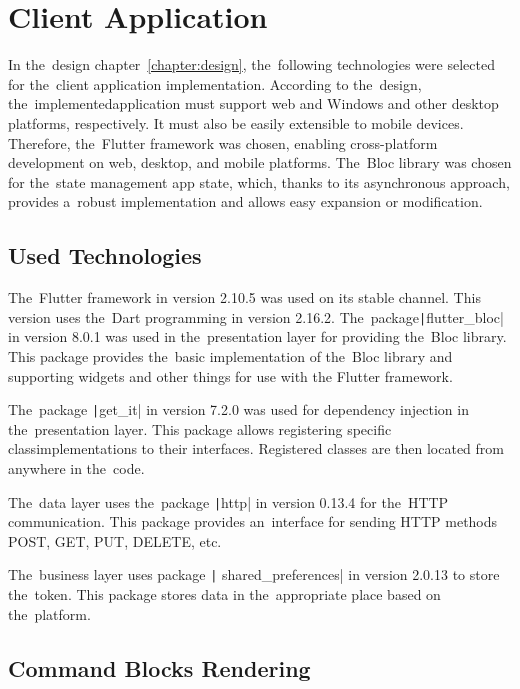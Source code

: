 \section{Client Application}

In the~design chapter~\ref{chapter:design}, the~following technologies were selected for the~client application implementation.
According to the~design, the~implemented\linebreak{}application must support web and Windows and other desktop platforms, respectively.
It must also be easily extensible to mobile devices.
Therefore, the~Flutter framework was chosen, enabling cross-platform development on web, desktop, and mobile platforms.
The~Bloc library was chosen for the~state management app state, which, thanks to its asynchronous approach, provides a~robust implementation and allows easy expansion or modification.

\subsection{Used Technologies}

The~Flutter framework in version 2.10.5 was used on its stable channel.
\linebreak
This version uses the~Dart programming in version 2.16.2.
The~package\linebreak{}\texttt|flutter_bloc| in version 8.0.1 was used in the~presentation layer for providing the~Bloc library.
This package provides the~basic implementation of the~Bloc library and supporting widgets and other things for use with the \mbox{Flutter} framework.

The~package \texttt|get_it| in version 7.2.0 was used for dependency injection in the~presentation layer.
This package allows registering specific class\linebreak{}implementations to their interfaces.
Registered classes are then located from anywhere in the~code.

The~data layer uses the~package \texttt|http| in version 0.13.4 for the~HTTP communication.
This package provides an~interface for sending HTTP methods POST, GET, PUT, DELETE, etc.

The~business layer uses package \texttt| shared_preferences| in version 2.0.13 to store the~token.
This package stores data in the~appropriate place based on the~platform.

\subsection{Command Blocks Rendering}

